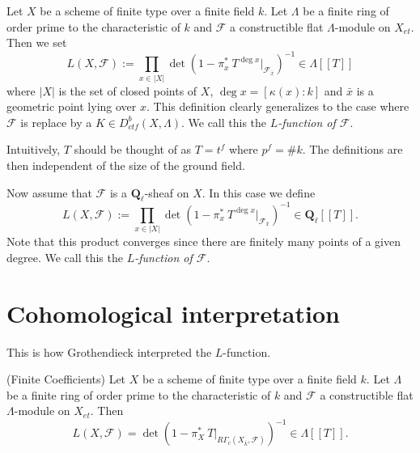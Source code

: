 \begin{definition}
\label{definition-L-function-finite-ring}
Let $X$ be a scheme of finite type over a finite field $k$. Let $\Lambda$ be a
finite ring of order prime to the characteristic of $k$ and $\mathcal{F}$ a
constructible flat $\Lambda$-module on $X_{et}$. Then we set
$$
L(X, \mathcal{F}) := \prod_{x\in |X|}\det\left(1-\pi_x^*\ T^{\deg
x}\Big|_{\mathcal{F}_{\bar x}}\right)^{-1}\in \Lambda [[ T ]]
$$
where $|X|$ is the set of closed points of $X$, $\deg x = [\kappa(x): k]$ and
$\bar x$ is a geometric point lying over $x$. This definition clearly
generalizes to the case where $\mathcal{F}$ is replace by a
$K \in D_{ctf}^b(X, \Lambda)$. We call this the {\it $L$-function of
$\mathcal{F}$}.
\end{definition}

\begin{remark}
\label{remark-T}
Intuitively, $T$ should be thought of as $T = t^f$ where $p^f = \# k$. The
definitions are then independent of the size of the ground field.
\end{remark}

\begin{definition}
\label{definition-L-function-l-adic}
Now assume that $\mathcal{F}$ is a $\mathbf{Q}_\ell$-sheaf on $X$.
In this case we define
$$
L(X, \mathcal{F}) := \prod_{x\in |X|}\det\left(1-\pi_x^*\ T^{\deg
x}\Big|_{\mathcal{F}_{\bar x}}\right)^{-1}\in \mathbf{Q}_\ell [[ T ]].
$$
Note that this product converges since there are finitely many points of a
given degree. We call this the {\it $L$-function of
$\mathcal{F}$}.
\end{definition}




\section{Cohomological interpretation}
\label{section-L-cohomological}

\noindent
This is how Grothendieck interpreted the $L$-function.

\begin{theorem}
\label{theorem-A}
(Finite Coefficients)
Let $X$ be a scheme of finite type over a finite field $k$. Let $\Lambda$ be a
finite ring of order prime to the characteristic of $k$ and $\mathcal{F}$ a
constructible flat $\Lambda$-module on $X_{et}$. Then
$$
L(X, \mathcal{F}) = \det\left(1-\pi_X^*\ T\Big|_{R\Gamma_c(X_{\bar k},
\mathcal{F})}\right)^{-1}\in \Lambda[[ T]].
$$
\end{theorem}

